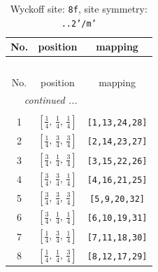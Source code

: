 \documentclass[fleqn,8pt]{jsarticle}
\begin{document}
\begin{longtable}{ccc}
\caption{Wyckoff site: {\tt 8f}, site symmetry: {\tt ..2'/m'}}
 \\
 \hline \hline
No. & position & mapping \\ \hline \endfirsthead

\multicolumn{2}{l}{\tablename\ \thetable{}} \\
 \hline \hline
No. & position & mapping \\ \hline \endhead

 \hline \hline
\multicolumn{2}{r}{\footnotesize\it continued ...} \\ \endfoot

 \hline \hline
\multicolumn{2}{r}{} \\ \endlastfoot

1 & $\left[ \frac{1}{4},\, \frac{1}{4},\, \frac{1}{4} \right]$ & {\tt [1,13,24,28]} \\ \hline
2 & $\left[ \frac{1}{4},\, \frac{3}{4},\, \frac{3}{4} \right]$ & {\tt [2,14,23,27]} \\ \hline
3 & $\left[ \frac{3}{4},\, \frac{1}{4},\, \frac{3}{4} \right]$ & {\tt [3,15,22,26]} \\ \hline
4 & $\left[ \frac{3}{4},\, \frac{3}{4},\, \frac{1}{4} \right]$ & {\tt [4,16,21,25]} \\ \hline
5 & $\left[ \frac{3}{4},\, \frac{3}{4},\, \frac{3}{4} \right]$ & {\tt [5,9,20,32]} \\ \hline
6 & $\left[ \frac{3}{4},\, \frac{1}{4},\, \frac{1}{4} \right]$ & {\tt [6,10,19,31]} \\ \hline
7 & $\left[ \frac{1}{4},\, \frac{3}{4},\, \frac{1}{4} \right]$ & {\tt [7,11,18,30]} \\ \hline
8 & $\left[ \frac{1}{4},\, \frac{1}{4},\, \frac{3}{4} \right]$ & {\tt [8,12,17,29]} \\
\end{longtable}
\renewcommand{\arraystretch}{1.2}
\end{document}
